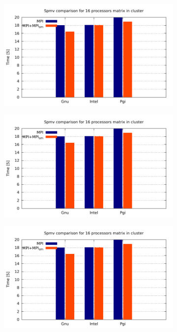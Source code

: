 \begin{figure} [h!]
    \centering
    \captionsetup{justification=centering, singlelinecheck=false}
    \begin{subfigure}{.6\textwidth}
      \centering
      \hspace*{-1.5cm} 
      \includegraphics[page=1, width=0.95\linewidth]{Plots/HybridProgramming/spmvCluster.pdf}
      \label{fig:HybridPorter}
    \end{subfigure}%
    \begin{subfigure}{.6\textwidth}
      \centering
      \hspace*{-1.5cm} 
      \includegraphics[page=2, width=0.95\linewidth]{Plots/HybridProgramming/spmvCluster.pdf}
      \label{fig:HybridStout}
    \end{subfigure}
    \begin{subfigure}{.6\textwidth}
      \centering
      \hspace*{-1.5cm} 
      \includegraphics[page=3, width=0.95\linewidth]{Plots/HybridProgramming/spmvCluster.pdf}

\end{subfigure}
\end{figure}
